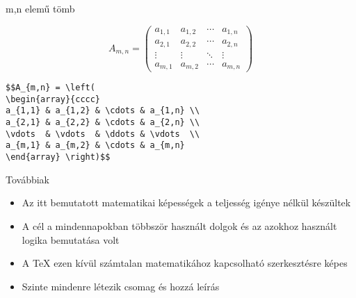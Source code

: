 \documentclass[11pt]{beamer}
\begin{document}
\begin{frame}[fragile]{m,n elemű tömb}

$$A_{m,n} = \left(
\begin{array}{cccc}
a_{1,1} & a_{1,2} & \cdots & a_{1,n} \\
a_{2,1} & a_{2,2} & \cdots & a_{2,n} \\
\vdots  & \vdots  & \ddots & \vdots  \\
a_{m,1} & a_{m,2} & \cdots & a_{m,n} 
\end{array} \right)$$

\begin{verbatim}
$$A_{m,n} = \left(
\begin{array}{cccc}
a_{1,1} & a_{1,2} & \cdots & a_{1,n} \\
a_{2,1} & a_{2,2} & \cdots & a_{2,n} \\
\vdots  & \vdots  & \ddots & \vdots  \\
a_{m,1} & a_{m,2} & \cdots & a_{m,n} 
\end{array} \right)$$
\end{verbatim}
\end{frame}

\begin{frame}{Továbbiak}
\begin{itemize}
\item Az itt bemutatott matematikai képességek a teljesség igénye nélkül készültek
\item A cél a mindennapokban többször használt dolgok és az azokhoz használt logika bemutatása volt
\item A \TeX{} ezen kívül számtalan matematikához kapcsolható szerkesztésre képes
\item Szinte mindenre létezik csomag és hozzá leírás
\end{itemize}
\end{frame}
\end{document}
